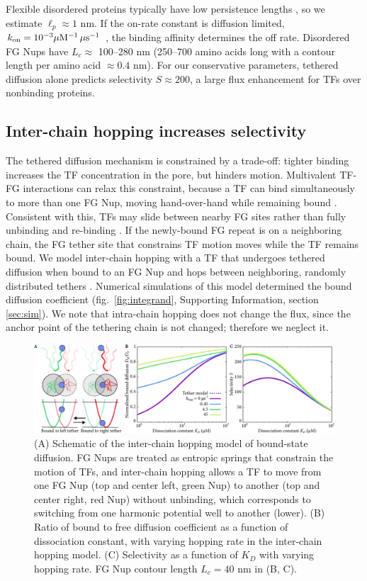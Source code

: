 Flexible disordered proteins typically have low persistence lengths \cite{receveur-brechot12}, so we estimate $\ell_p \approx 1$ nm.  If the on-rate constant is diffusion limited, $k_{\rm on} = 10^{-3}\mu \mathrm{M}^{-1} \, \mu \mathrm{s}^{-1}$ \cite{milles15, hough15}, the binding affinity determines the off rate.  Disordered FG Nups have $L_c\approx$ 100--280 nm (250--700 amino acids long \cite{patel07} with a contour length per amino acid $\approx 0.4$ nm). For our conservative parameters, tethered diffusion alone predicts selectivity $S \approx 200$, a large flux enhancement for TFs over nonbinding proteins.

\subsection{Inter-chain hopping increases selectivity}
The tethered diffusion mechanism is constrained by a trade-off:
tighter binding increases the TF concentration in the pore, but
hinders motion.  Multivalent TF-FG interactions can relax this
constraint, because a TF can bind simultaneously to more than one FG
Nup, moving hand-over-hand while remaining bound
\cite{tetenbaum-novatt12}. Consistent with this, TFs may slide between
nearby FG sites rather than fully unbinding and re-binding
\cite{raveh16}. If the newly-bound FG repeat is on a neighboring
chain, the FG tether site that constrains TF motion moves while the TF
remains bound.  We model inter-chain hopping with a TF that undergoes
tethered diffusion when bound to an FG Nup and hops between
neighboring, randomly distributed tethers .
Numerical simulations of this model determined the bound diffusion
coefficient (fig.~\ref{fig:integrand}, Supporting Information, section
\ref{sec:sim}). We note that intra-chain hopping does not change the
flux, since the anchor point of the tethering chain is not changed;
therefore we neglect it.


\begin{figure}
\centering
\includegraphics[width = \textwidth]{figs/ch02/fig4.pdf}
\caption{(A) Schematic of the inter-chain hopping model of bound-state diffusion. FG Nups are treated as entropic springs that constrain the motion of TFs, and inter-chain hopping allows a TF to move from one FG Nup (top and center left, green Nup) to another (top and center right, red Nup) without unbinding, which corresponds to switching from one harmonic potential well to another (lower). (B) Ratio of bound to free diffusion coefficient as a function of dissociation constant, with varying hopping rate in the inter-chain hopping model.  (C) Selectivity as a function of $K_D$ with varying hopping rate. FG Nup contour length $L_c = 40$ nm in (B, C). }
\label{fig:hopping}
\end{figure}

